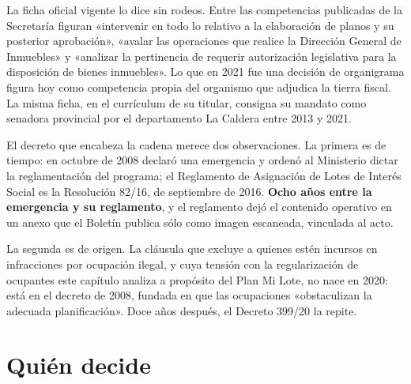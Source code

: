 La ficha oficial vigente lo dice sin rodeos. Entre las competencias publicadas de la Secretaría figuran «intervenir en todo lo relativo a la elaboración de planos y su posterior aprobación», «avalar las operaciones que realice la Dirección General de Inmuebles» y «analizar la pertinencia de requerir autorización legislativa para la disposición de bienes inmuebles». Lo que en 2021 fue una decisión de organigrama figura hoy como competencia propia del organismo que adjudica la tierra fiscal. La misma ficha, en el currículum de su titular, consigna su mandato como senadora provincial por el departamento La Caldera entre 2013 y 2021.

El decreto que encabeza la cadena merece dos observaciones. La primera es de tiempo: en octubre de 2008 declaró una emergencia y ordenó al Ministerio dictar la reglamentación del programa; el Reglamento de Asignación de Lotes de Interés Social es la Resolución 82/16, de septiembre de 2016. \textbf{Ocho años entre la emergencia y su reglamento}, y el reglamento dejó el contenido operativo en un anexo que el Boletín publica sólo como imagen escaneada, vinculada al acto.

La segunda es de origen. La cláusula que excluye a quienes estén incursos en infracciones por ocupación ilegal, y cuya tensión con la regularización de ocupantes este capítulo analiza a propósito del Plan Mi Lote, no nace en 2020: está en el decreto de 2008, fundada en que las ocupaciones «obstaculizan la adecuada planificación». Doce años después, el Decreto 399/20 la repite.

\section{Quién decide}

